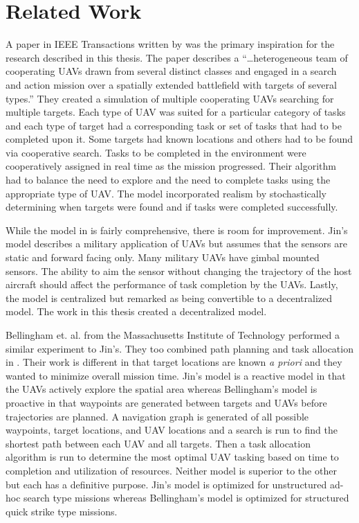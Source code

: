 \chapter{Related Work}

A paper in IEEE Transactions written by \cite{jin} was the primary inspiration for the research described in this thesis.  The paper describes a ``\ldots heterogeneous team of cooperating UAVs drawn from several distinct classes and engaged in a search and action mission over a spatially extended battlefield with targets of several types.'' They created a simulation of multiple cooperating UAVs searching for multiple targets.  Each type of UAV was suited for a particular category of tasks and each type of target had a corresponding task or set of tasks that had to be completed upon it.  Some targets had known locations and others had to be found via cooperative search.  Tasks to be completed in the environment were cooperatively assigned in real time as the mission progressed.  Their algorithm had to balance the need to explore and the need to complete tasks using the appropriate type of UAV.  The model incorporated realism by stochastically determining when targets were found and if tasks were completed successfully.

While the model in \cite{jin} is fairly comprehensive, there is room for improvement.  Jin's model describes a military application of UAVs but assumes that the sensors are static and forward facing only.  Many military UAVs have gimbal mounted sensors.  The ability to aim the sensor without changing the trajectory of the host aircraft should affect the performance of task completion by the UAVs.  Lastly, the model is centralized but remarked as being convertible to a decentralized model.  The work in this thesis created a decentralized model.


Bellingham et. al. from the Massachusetts Institute of Technology performed a similar experiment to Jin's.   They too combined path planning and task allocation in \cite{bellingham}.  Their work is different in that target locations are known \textit{a priori} and they wanted to minimize overall mission time.  Jin's model is a reactive model in that the UAVs actively explore the spatial area whereas Bellingham's model is proactive in that waypoints are generated between targets and UAVs before trajectories are planned.  A navigation graph is generated of all possible waypoints, target locations, and UAV locations and a search is run to find the shortest path between each UAV and all targets.  Then a task allocation algorithm is run to determine the most optimal UAV tasking based on time to completion and utilization of resources.  Neither model is superior to the other but each has a definitive purpose.  Jin's model is optimized for unstructured ad-hoc search type missions whereas Bellingham's model is optimized for structured quick strike type missions.

